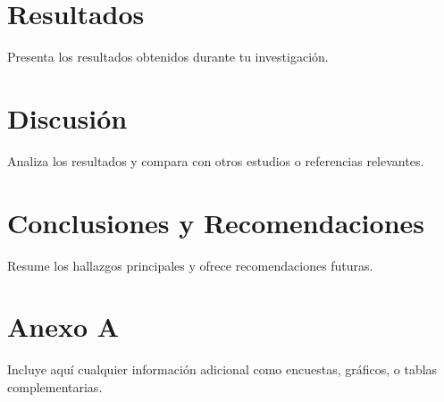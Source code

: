 \documentclass[12pt]{report}
\begin{document}
\chapter{Resultados}
Presenta los resultados obtenidos durante tu investigación.

\chapter{Discusión}
Analiza los resultados y compara con otros estudios o referencias relevantes.

\chapter{Conclusiones y Recomendaciones}
Resume los hallazgos principales y ofrece recomendaciones futuras.




\appendix
\chapter{Anexo A}
Incluye aquí cualquier información adicional como encuestas, gráficos, o tablas complementarias.
\end{document}
